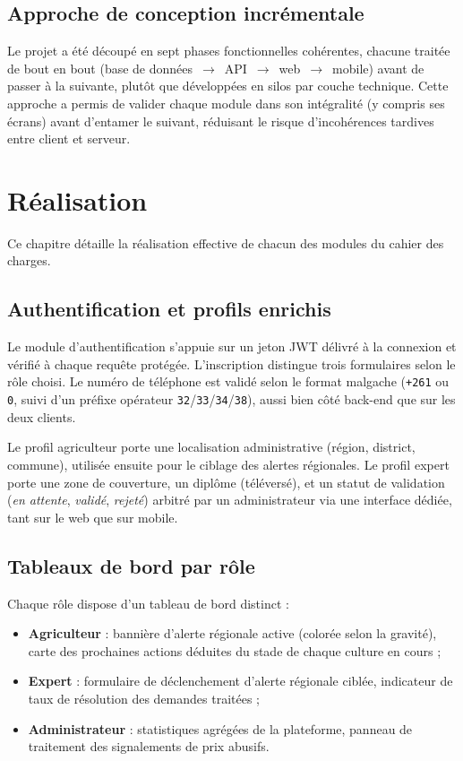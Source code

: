 \documentclass[12pt,a4paper]{report}
\begin{document}
\section{Approche de conception incrémentale}

Le projet a été découpé en sept phases fonctionnelles cohérentes, chacune traitée de bout en bout (base de données~$\rightarrow$~API~$\rightarrow$~web~$\rightarrow$~mobile) avant de passer à la suivante, plutôt que développées en silos par couche technique. Cette approche a permis de valider chaque module dans son intégralité (y compris ses écrans) avant d'entamer le suivant, réduisant le risque d'incohérences tardives entre client et serveur.

\chapter{Réalisation}
\label{chap:realisation}

Ce chapitre détaille la réalisation effective de chacun des modules du cahier des charges.

\section{Authentification et profils enrichis}

Le module d'authentification s'appuie sur un jeton JWT délivré à la connexion et vérifié à chaque requête protégée. L'inscription distingue trois formulaires selon le rôle choisi. Le numéro de téléphone est validé selon le format malgache (\texttt{+261} ou \texttt{0}, suivi d'un préfixe opérateur \texttt{32}/\texttt{33}/\texttt{34}/\texttt{38}), aussi bien côté back-end que sur les deux clients.

Le profil agriculteur porte une localisation administrative (région, district, commune), utilisée ensuite pour le ciblage des alertes régionales. Le profil expert porte une zone de couverture, un diplôme (téléversé), et un statut de validation (\emph{en attente}, \emph{validé}, \emph{rejeté}) arbitré par un administrateur via une interface dédiée, tant sur le web que sur mobile.

\section{Tableaux de bord par rôle}

Chaque rôle dispose d'un tableau de bord distinct :
\begin{itemize}
    \item \textbf{Agriculteur} : bannière d'alerte régionale active (colorée selon la gravité), carte des \og prochaines actions \fg{} déduites du stade de chaque culture en cours ;
    \item \textbf{Expert} : formulaire de déclenchement d'alerte régionale ciblée, indicateur de taux de résolution des demandes traitées ;
    \item \textbf{Administrateur} : statistiques agrégées de la plateforme, panneau de traitement des signalements de prix abusifs.
\end{itemize}
\end{document}
